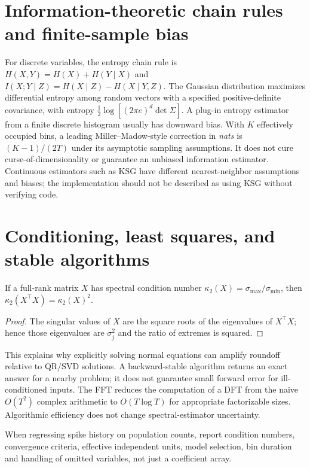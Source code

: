 \section{Information-theoretic chain rules and finite-sample bias}
For discrete variables, the entropy chain rule is
$H(X,Y)=H(X)+H(Y\mid X)$ and
$I(X;Y\mid Z)=H(X\mid Z)-H(X\mid Y,Z)$.
The Gaussian distribution maximizes differential entropy among
random vectors with a specified positive-definite covariance,
with entropy $\frac12\log[(2\pi e)^d\det\Sigma]$.
A plug-in entropy estimator from a finite discrete histogram
usually has downward bias. With $K$ effectively occupied bins,
a leading Miller--Madow-style correction in \emph{nats} is
$(K-1)/(2T)$ under its asymptotic sampling assumptions.
It does not cure curse-of-dimensionality or guarantee an unbiased
information estimator. Continuous estimators such as KSG have
different nearest-neighbor assumptions and biases; the
 implementation
should not be described as using KSG without verifying code.

\section{Conditioning, least squares, and stable algorithms}
If a full-rank matrix $X$ has spectral condition number
$\kappa_2(X)=\sigma_{\max}/\sigma_{\min}$, then
$\kappa_2(X^\top X)=\kappa_2(X)^2$.
\begin{proof}
The singular values of $X$ are the square roots of the
eigenvalues of $X^\top X$; hence those eigenvalues are
$\sigma_j^2$ and the ratio of extremes is squared.
\end{proof}
This explains why explicitly solving normal equations can
amplify roundoff relative to QR/SVD solutions. A backward-stable
algorithm returns an exact answer for a nearby problem; it does
not guarantee small forward error for ill-conditioned inputs.
The FFT reduces the computation of a DFT from the naive
$O(T^2)$ complex arithmetic to $O(T\log T)$ for appropriate
factorizable sizes. Algorithmic efficiency does not change
spectral-estimator uncertainty.

\begin{example}\sloppy
When regressing spike history on population counts, report
condition numbers, convergence criteria, effective independent
units, model selection, bin duration and handling of omitted
variables, not just a coefficient array.
\end{example}
